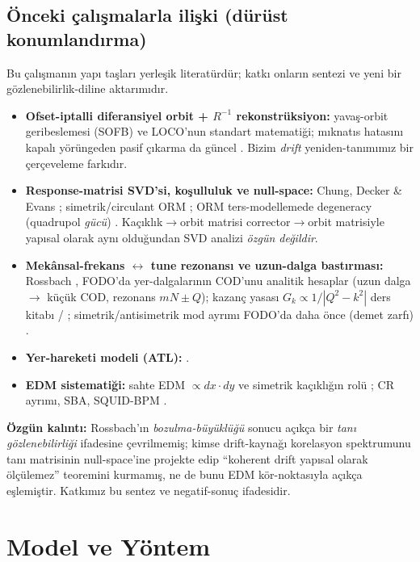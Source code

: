 \documentclass[twocolumn,a4paper,10pt]{article}
\begin{document}
\subsection{Önceki çalışmalarla ilişki (dürüst konumlandırma)}
Bu çalışmanın yapı taşları yerleşik literatürdür; katkı onların sentezi ve yeni bir
gözlenebilirlik-diline aktarımıdır.
\begin{itemize}
\item \textbf{Ofset-iptalli diferansiyel orbit + $R^{-1}$ rekonstrüksiyon:}
  yavaş-orbit geribeslemesi (SOFB) ve LOCO'nun \cite{safranek1997} standart
  matematiği; mıknatıs hatasını kapalı yörüngeden pasif çıkarma da güncel
  \cite{huang2022}. Bizim \emph{drift} yeniden-tanımımız bir çerçeveleme farkıdır.
\item \textbf{Response-matrisi SVD'si, koşulluluk ve null-space:} Chung, Decker \&
  Evans \cite{chung1993}; simetrik/circulant ORM \cite{mirza2019}; ORM
  ters-modellemede degeneracy (quadrupol \emph{gücü}) \cite{wegscheider2023}.
  Kaçıklık$\to$orbit matrisi corrector$\to$orbit matrisiyle yapısal olarak aynı
  olduğundan SVD analizi \emph{özgün değildir}.
\item \textbf{Mekânsal-frekans $\leftrightarrow$ tune rezonansı ve uzun-dalga
  bastırması:} Rossbach \cite{rossbach1989}, FODO'da yer-dalgalarının COD'unu
  analitik hesaplar (uzun dalga $\to$ küçük COD, rezonans $mN\pm Q$); kazanç yasası
  $G_k\propto 1/|Q^2-k^2|$ ders kitabı / \cite{khan2017}; simetrik/antisimetrik
  mod ayrımı FODO'da daha önce (demet zarfı) \cite{tiefenback1985}.
\item \textbf{Yer-hareketi modeli (ATL):} \cite{shiltsev1995, parkhomchuk1994}.
\item \textbf{EDM sistematiği:} sahte EDM $\propto dx\cdot dy$ ve simetrik kaçıklığın
  rolü \cite{haciomeroglu2017}; CR ayrımı, SBA, SQUID-BPM \cite{omarov2022}.
\end{itemize}
\textbf{Özgün kalıntı:} Rossbach'ın \emph{bozulma-büyüklüğü} sonucu açıkça bir
\emph{tanı gözlenebilirliği} ifadesine çevrilmemiş; kimse drift-kaynağı korelasyon
spektrumunu tanı matrisinin null-space'ine projekte edip ``koherent drift yapısal
olarak ölçülemez'' teoremini kurmamış, ne de bunu EDM kör-noktasıyla açıkça
eşlemiştir. Katkımız bu sentez ve negatif-sonuç ifadesidir.

\section{Model ve Yöntem}
\end{document}
